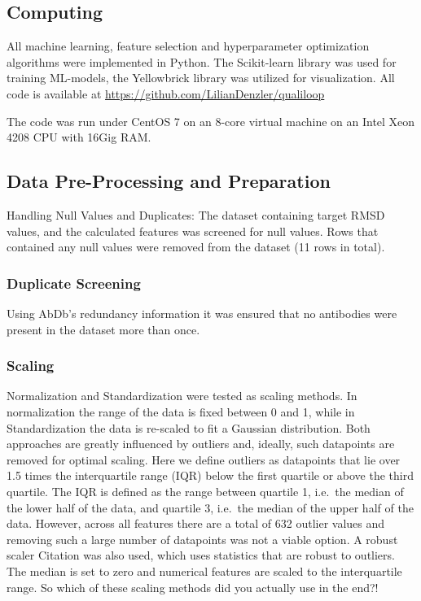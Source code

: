 \documentclass[12pt]{article}
\newcommand{\lilian}[1]{ {\color{red}{\bfseries Lilian:} #1}}
\begin{document}
\subsection{Computing}
All machine learning, feature selection and hyperparameter
optimization algorithms were implemented in Python. The Scikit-learn
library was used for training ML-models, the
Yellowbrick\cite{Bengfort2021} library was utilized for
visualization. All code is available at
\url{https://github.com/LilianDenzler/qualiloop}

The code was run under CentOS 7 on an 8-core virtual machine on an
Intel Xeon 4208 CPU with 16Gig RAM.

\subsection{Data Pre-Processing and Preparation}
Handling Null Values and Duplicates: The dataset containing target
RMSD values, and the calculated features was screened for null
values.
Rows that contained any null values were
removed from the dataset (11 rows in total).

\subsubsection{Duplicate Screening}
Using AbDb's redundancy information it was ensured that no antibodies
were present in the dataset more than once.

\subsubsection{Scaling}
Normalization and Standardization were tested as scaling methods. In normalization the range of the data is fixed between 0 and 1, while in Standardization the data is re-scaled to fit a Gaussian distribution. Both
approaches are greatly influenced by outliers and, ideally, such datapoints are
removed for optimal scaling. Here we define outliers as
datapoints that lie over 1.5 times the interquartile range (IQR) below
the first quartile or above the third quartile. The IQR is defined as
the range between quartile 1, i.e.\ the median of the lower half of the
data, and quartile 3, i.e.\ the median of the upper half of the
data. However, across all features there are a total of 632 outlier
values and removing such a large number of datapoints was not a viable
option. A robust scaler\cite{XXXX} \lilian{Citation} was also used, which uses statistics that are
robust to outliers. The median is set to zero and numerical features
are scaled to the interquartile range. \lilian{So which of these scaling methods did you actually use in the end?!}
\end{document}
